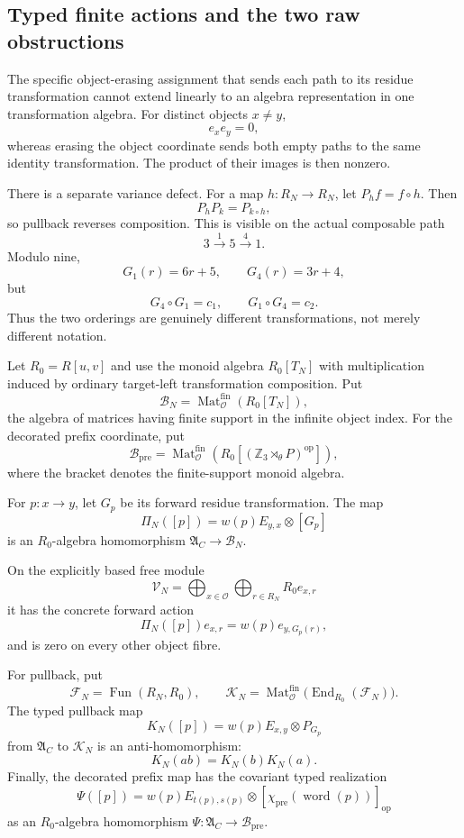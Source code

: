 \subsection{Typed finite actions and the two raw obstructions}
\label{subsec:typed-finite-actions}

The specific object-erasing assignment that sends each path to its residue
transformation cannot extend linearly to an algebra representation in one
transformation algebra.  For distinct objects $x\ne y$,
\[
 e_xe_y=0,
\]
whereas erasing the object coordinate sends both empty paths to the same
identity transformation.  The product of their images is then nonzero.

There is a separate variance defect.  For a map $h:R_N\to R_N$, let
$P_hf=f\circ h$.  Then
\[
 P_hP_k=P_{k\circ h},
\]
so pullback reverses composition.  This is visible on the actual composable
path
\[
 3\xrightarrow{1}5\xrightarrow{4}1.
\]
Modulo nine,
\[
 G_1(r)=6r+5,
 \qquad G_4(r)=3r+4,
\]
but
\[
 G_4\circ G_1=c_1,
 \qquad G_1\circ G_4=c_2.
\]
Thus the two orderings are genuinely different transformations, not merely
different notation.

Let $R_0=R[u,v]$ and use the monoid algebra $R_0[T_N]$ with multiplication
induced by ordinary target-left transformation composition.  Put
\[
 \mathcal B_N=\operatorname{Mat}^{\mathrm{fin}}_{\mathcal O}(R_0[T_N]),
\]
the algebra of matrices having finite support in the infinite object index.
For the decorated prefix coordinate, put
\[
 \mathcal B_{\mathrm{pre}}
 =\operatorname{Mat}^{\mathrm{fin}}_{\mathcal O}
   \left(R_0\left[(\mathbb Z_3\rtimes_\theta P)^{\mathrm{op}}\right]\right),
\]
where the bracket denotes the finite-support monoid algebra.

\begin{proposition}
\label{prop:weighted-typed-representations}
For $p:x\to y$, let $G_p$ be its forward residue transformation.  The map
\begin{equation}
\label{eq:typed-forward-representation}
 \Pi_N([p])=w(p)E_{y,x}\otimes[G_p]
\end{equation}
is an $R_0$-algebra homomorphism
$\mathfrak A_C\to\mathcal B_N$.

On the explicitly based free module
\[
 \mathcal V_N=\bigoplus_{x\in\mathcal O}
     \bigoplus_{r\in R_N}R_0e_{x,r}
\]
it has the concrete forward action
\[
 \Pi_N([p])e_{x,r}=w(p)e_{y,G_p(r)},
\]
and is zero on every other object fibre.

For pullback, put
\[
 \mathcal F_N=\operatorname{Fun}(R_N,R_0),
 \qquad
 \mathcal K_N=
 \operatorname{Mat}^{\mathrm{fin}}_{\mathcal O}
   \bigl(\operatorname{End}_{R_0}(\mathcal F_N)\bigr).
\]
The typed pullback map
\[
 K_N([p])=w(p)E_{x,y}\otimes P_{G_p}
\]
from $\mathfrak A_C$ to $\mathcal K_N$ is an anti-homomorphism:
\[
 K_N(ab)=K_N(b)K_N(a).
\]
Finally, the decorated prefix map has the covariant typed realization
\[
 \Psi([p])
 =w(p)E_{t(p),s(p)}\otimes
   [\chi_{\mathrm{pre}}(\operatorname{word}(p))]_{\mathrm{op}}
\]
as an $R_0$-algebra homomorphism
$\Psi:\mathfrak A_C\to\mathcal B_{\mathrm{pre}}$.
\end{proposition}

